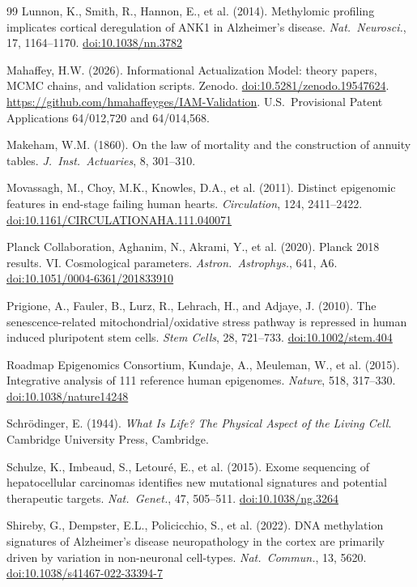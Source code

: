 \documentclass[12pt,a4paper]{article}
\newcommand{\doi}[1]{\href{https://doi.org/#1}{doi:#1}}
\begin{document}
\begin{thebibliography}{99}
Lunnon, K., Smith, R., Hannon, E., et al. (2014).
Methylomic profiling implicates cortical deregulation of ANK1 in Alzheimer's disease.
\textit{Nat.\ Neurosci.}, 17, 1164--1170.
\doi{10.1038/nn.3782}

Mahaffey, H.W. (2026).
Informational Actualization Model: theory papers, MCMC chains, and validation scripts.
Zenodo. \doi{10.5281/zenodo.19547624}.
\url{https://github.com/hmahaffeyges/IAM-Validation}.
U.S.\ Provisional Patent Applications 64/012,720 and 64/014,568.

Makeham, W.M. (1860).
On the law of mortality and the construction of annuity tables.
\textit{J.\ Inst.\ Actuaries}, 8, 301--310.

Movassagh, M., Choy, M.K., Knowles, D.A., et al. (2011).
Distinct epigenomic features in end-stage failing human hearts.
\textit{Circulation}, 124, 2411--2422.
\doi{10.1161/CIRCULATIONAHA.111.040071}

Planck Collaboration, Aghanim, N., Akrami, Y., et al. (2020).
Planck 2018 results. VI. Cosmological parameters.
\textit{Astron.\ Astrophys.}, 641, A6.
\doi{10.1051/0004-6361/201833910}

Prigione, A., Fauler, B., Lurz, R., Lehrach, H., and Adjaye, J. (2010).
The senescence-related mitochondrial/oxidative stress pathway is repressed in human induced pluripotent stem cells.
\textit{Stem Cells}, 28, 721--733.
\doi{10.1002/stem.404}

Roadmap Epigenomics Consortium, Kundaje, A., Meuleman, W., et al. (2015).
Integrative analysis of 111 reference human epigenomes.
\textit{Nature}, 518, 317--330.
\doi{10.1038/nature14248}

Schr\"odinger, E. (1944).
\textit{What Is Life? The Physical Aspect of the Living Cell}.
Cambridge University Press, Cambridge.

Schulze, K., Imbeaud, S., Letour\'e, E., et al. (2015).
Exome sequencing of hepatocellular carcinomas identifies new mutational signatures and potential therapeutic targets.
\textit{Nat.\ Genet.}, 47, 505--511.
\doi{10.1038/ng.3264}

Shireby, G., Dempster, E.L., Policicchio, S., et al. (2022).
DNA methylation signatures of Alzheimer's disease neuropathology in the cortex are primarily driven by variation in non-neuronal cell-types.
\textit{Nat.\ Commun.}, 13, 5620.
\doi{10.1038/s41467-022-33394-7}


\end{thebibliography}
\end{document}
